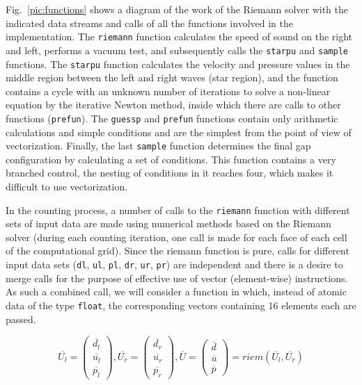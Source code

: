 \documentclass[utf8,english]{psta}%
\begin{document}
Fig.~\ref{pic:functions} shows a diagram of the work of the Riemann solver with the indicated data streams and calls of all the functions involved in the implementation. The \texttt{riemann} function calculates the speed of sound on the right and left, performs a vacuum test, and subsequently calls the \texttt{starpu} and \texttt{sample} functions.
The \texttt{starpu} function calculates the velocity and pressure values in the middle region between the left and right waves (star region), and the function contains a cycle with an unknown number of iterations to solve a non-linear equation by the iterative Newton method, inside which there are calls to other functions (\texttt{prefun}).
The \texttt{guessp} and \texttt{prefun} functions contain only arithmetic calculations and simple conditions and are the simplest from the point of view of vectorization.
Finally, the last \texttt{sample} function determines the final gap configuration by calculating a set of conditions.
This function contains a very branched control, the nesting of conditions in it reaches four, which makes it difficult to use vectorization.

In the counting process, a number of calls to the \texttt{riemann} function with different sets of input data are made using numerical methods based on the Riemann solver (during each counting iteration, one call is made for each face of each cell of the computational grid).
Since the riemann function is pure, calls for different input data sets (\texttt{dl}, \texttt{ul}, \texttt{pl}, \texttt{dr}, \texttt{ur}, \texttt{pr}) are independent and there is a desire to merge calls for the purpose of effective use of vector (element-wise) instructions.
As such a combined call, we will consider a function in which, instead of atomic data of the type \texttt{float}, the corresponding vectors containing 16 elements each are passed.

\begin{equation}\label{eq:riemann_16}
\overline{U_l} = \left( \begin{array}{ccc} \overline{d_l} \\ \overline{u_l} \\ \overline{p_l} \end{array} \right),
\overline{U_r} = \left( \begin{array}{ccc} \overline{d_r} \\ \overline{u_r} \\ \overline{p_r} \end{array} \right),
\overline{U} = \left( \begin{array}{ccc} \overline{d} \\ \overline{u} \\ \overline{p} \end{array} \right) = riem(\overline{U_l}, \overline{U_r})
\end{equation}
\end{document}
